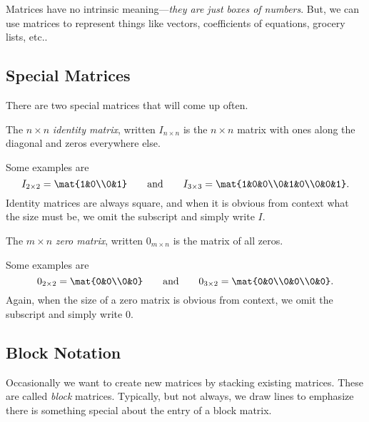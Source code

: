 	\bigskip
	Matrices have no intrinsic meaning---\emph{they are just boxes of numbers}.
	But, we can use matrices to represent things like vectors, coefficients of
	equations, grocery lists, etc..

\subsection{Special Matrices}
	There are two special matrices that will come up often.
	\begin{definition}
		The $n\times n$ \emph{identity matrix}, written $I_{n\times n}$ is the $n\times n$
		matrix with ones along the diagonal and zeros everywhere else.
	\end{definition}
	Some examples are
	\[
		I_{2\times 2}=\mat{1&0\\0&1}\qquad\text{and}\qquad I_{3\times 3}=\mat{1&0&0\\0&1&0\\0&0&1}.
	\]
	Identity matrices are always square, and when it is obvious from context what
	the size must be, we omit the subscript and simply write $I$.

	\begin{definition}
		The $m\times n$ \emph{zero matrix},
		written $0_{m\times n}$ is the matrix of all zeros.
	\end{definition}
	Some examples are
	\[
		0_{2\times 2}=\mat{0&0\\0&0}\qquad\text{and}\qquad
		0_{3\times 2}=\mat{0&0\\0&0\\0&0}.
	\]
	Again, when the size of a zero matrix is obvious from context, we omit the subscript
	and simply write $0$.

\subsection{Block Notation}
	Occasionally we want to create new matrices by stacking existing matrices.
	These are called \emph{block} matrices. Typically, but not always, we draw lines
	to emphasize there is something special about the entry of a block matrix.

